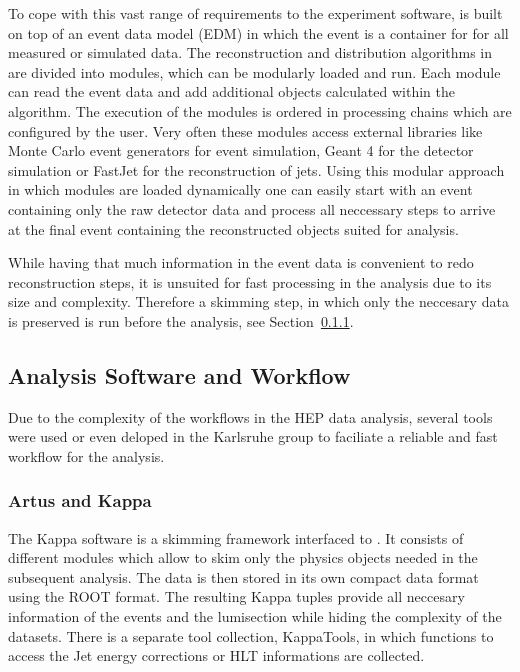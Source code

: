 To cope with this vast range of requirements to the experiment software, \CMSSW
is built on top of an event data model (EDM) in which the event is a
container for for all measured or simulated data. The reconstruction and
distribution algorithms in \CMSSW are divided into modules, which can be
modularly loaded and run. Each module can read the event data and add additional
objects calculated within the algorithm. The execution of the modules is ordered
in processing chains which are configured by the user. Very often these modules
access external libraries like Monte Carlo event generators for event
simulation, Geant 4 for the detector simulation or FastJet for the
reconstruction of jets. Using this modular approach in which modules are loaded
dynamically one can easily start with an event containing only the raw detector
data and process all neccessary steps to arrive at the final event containing
the reconstructed objects suited for analysis.

While having that much information in the event data is convenient to redo
reconstruction steps, it is unsuited for fast processing in the analysis due to
its size and complexity. Therefore a skimming step, in which only the neccesary
data is preserved is run before the analysis, see Section~\ref{artus_kappa}.

\subsection{Analysis Software and Workflow}

Due to the complexity of the workflows in the HEP data analysis, several tools
were used or even deloped in the Karlsruhe group to faciliate a reliable and
fast workflow for the analysis. 

\subsubsection{Artus and Kappa}
\label{artus_kappa}

The Kappa software is a skimming framework interfaced to \CMSSW. It consists of
different modules which allow to skim only the physics objects needed in the
subsequent analysis. The data is then stored in its own compact data format
using the ROOT format. The resulting Kappa tuples provide all neccesary
information of the events and the lumisection while hiding the complexity of the
\CMSSW datasets. There is a separate tool collection, KappaTools, in which
functions to access the Jet energy corrections or HLT informations are
collected.

